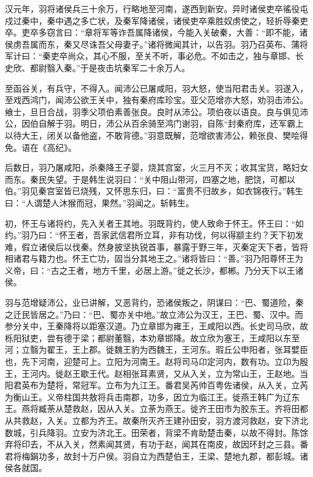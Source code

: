 \documentclass[]{article}
\begin{document}
汉元年，羽将诸侯兵三十余万，行略地至河南，遂西到新安。异时诸侯吏卒徭役屯戍过秦中，秦中遇之多亡状，及秦军降诸侯，诸侯吏卒乘胜奴虏使之，轻折辱秦吏卒。吏卒多窃言曰：``章将军等诈吾属降诸侯，今能入关破秦，大善：``即不能，诸侯虏吾属而东，秦又尽诛吾父母妻子。''诸将微闻其计，以告羽。羽乃召英布、蒲将军计曰：``秦吏卒尚众，其心不服，至关不听，事必危。不如击之，独与章邯、长史欣、都尉翳入秦。''于是夜击坑秦军二十余万人。

至函谷关，有兵守，不得入。闻沛公已屠咸阳，羽大怒，使当阳君击关。羽遂入，至戏西鸿门，闻沛公欲王关中，独有秦府库珍宝。亚父范增亦大怒，劝羽击沛公。飨士，旦日合战，羽季父项伯素善张良。良时从沛公。项伯夜以语良。良与俱见沛公，因伯自解于羽。明日，沛公从百余骑至鸿门谢羽，自陈``封秦府库，还军霸上以待大王，闭关以备他盗，不敢背德。''羽意既解，范增欲害沛公，赖张良、樊哙得免。语在《高纪》。

后数日，羽乃屠咸阳，杀秦降王子婴，烧其宫室，火三月不灭；收其宝货，略妇女而东。秦民失望。于是韩生说羽曰：``关中阻山带河，四塞之地，肥饶，可都以伯。''羽见秦宫室皆已烧残，又怀思东归，曰：``富贵不归故乡，如衣锦夜行。''韩生曰：``人谓楚人沐猴而冠，果然。''羽闻之。斩韩生。

初，怀王与诸将约，先入关者王其地。羽既背约，使人致命于怀王。怀王曰：``如约。''羽乃曰：``怀王者，吾家武信君所立耳，非有功伐，何以得颛主约？天下初发难，假立诸侯后以伐秦。然身披坚执锐首事，暴露于野三年，灭秦定天下者，皆将相诸君与籍力也。怀王亡功，固当分其地王之。''诸将皆曰：``善。''羽乃阳尊怀王为义帝，曰：``古之王者，地方千里，必居上游。''徙之长沙，都郴。乃分天下以王诸侯。

羽与范增疑沛公，业已讲解，又恶背约，恐诸侯叛之，阴谋曰：``巴、蜀道险，秦之迁民皆居之。''乃曰：``巴、蜀亦关中地。''故立沛公为汉王，王巴、蜀、汉中。而参分关中，王秦降将以距塞汉道。乃立章邯为雍王，王咸阳以西。长史司马欣，故栎阳狱吏，尝有德于梁；都尉董翳，本劝章邯降。故立欣为塞王，王咸阳以东至河；立翳为翟王，王上郡。徙魏王豹为西魏王，王河东。瑕丘公申阳者，张耳嬖臣也，先下河南，迎楚可上。立阳为河南王。赵将司马卬定河内，数有功。立卬为殷王，王河内。徙赵王歇王代。赵相张耳素贤，又从入关，立为常山王，王赵地。当阳君英布为楚将，常冠军。立布为九江王。番君吴芮帅百粤佐诸侯，从入关，立芮为衡山王。义帝柱国共敖将兵击南郡，功多，因立为临江王。徙燕王韩广为辽东王。燕将臧荼从楚救赵，因从入关。立荼为燕王。徙齐王田市为胶东王。齐将田都从共救赵，入关。立都为齐王。故秦所灭齐王建孙田安，羽方渡河救赵，安下济北数城，引兵降羽。立安为济北王。田荣者，背梁不肯助楚击秦，以故不得封。陈馀弃将印去，不从入关，然素闻其贤，有功于赵，闻其在南皮，故因环封之三县。番君将梅鋗功多，故封十万户侯。羽自立为西楚伯王，王梁、楚地九郡，都彭城。诸侯各就国。
\end{document}
